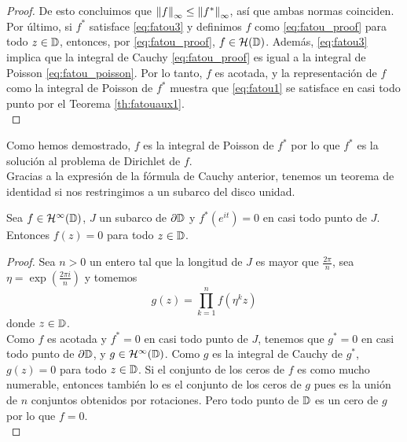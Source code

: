 \begin{proof}
    De esto concluimos que $\left\lVert f\right\rVert_{\infty} \leq \left\lVert f^*\right\rVert_{\infty}$, así que ambas normas coinciden. \\

    Por último, si $f^*$ satisface \eqref{eq:fatou3} y definimos $f$ como \eqref{eq:fatou_proof} para todo $z \in \mathbb{D}$, entonces, por \eqref{eq:fatou_proof}, $f \in \mathcal{H}(\mathbb{D})$. Además, \eqref{eq:fatou3} implica que la integral de Cauchy \eqref{eq:fatou_proof} es igual a la integral de Poisson \eqref{eq:fatou_poisson}. Por lo tanto, $f$ es acotada, y la representación de $f$ como la integral de Poisson de $f^*$ muestra que \eqref{eq:fatou1} se satisface en casi todo punto por el Teorema \ref{th:fatouaux1}. \\
\end{proof}

Como hemos demostrado, $f$ es la integral de Poisson de $f^*$ por lo que $f^*$ es la solución al problema de Dirichlet de $f$.\\

Gracias a la expresión de la fórmula de Cauchy anterior, tenemos un teorema de identidad si nos restringimos a un subarco del disco unidad. \\

\begin{theorem}
    Sea $f \in \mathcal{H}^{\infty}(\mathbb{D})$, $J$ un subarco de $\partial \mathbb{D}$ y $f^*(e^{it}) = 0$ en casi todo punto de $J$. Entonces $f(z) = 0$ para todo $z \in \mathbb{D}$.
\end{theorem}

\begin{proof}
    Sea $n > 0$ un entero tal que la longitud de $J$ es mayor que $\frac{2 \pi}{n}$, sea $\eta = \exp(\frac{2 \pi i}{n})$ y tomemos
    \begin{equation*}
        g(z) = \prod_{k=1}^{n} f(\eta^k z)
    \end{equation*}
    donde $z \in \mathbb{D}$. \\

    Como $f$ es acotada y $f^* = 0$ en casi todo punto de $J$, tenemos que $g^* = 0$ en casi todo punto de $\partial \mathbb{D}$, y $g \in \mathcal{H}^{\infty}(\mathbb{D})$. Como $g$ es la integral de Cauchy de $g^*$, $g(z) = 0$ para todo $z \in \mathbb{D}$. Si el conjunto de los ceros de $f$ es como mucho numerable, entonces también lo es el conjunto de los ceros de $g$ pues es la unión de $n$ conjuntos obtenidos por rotaciones. Pero todo punto de $\mathbb{D}$ es un cero de $g$ por lo que $f = 0$. \\
\end{proof}


